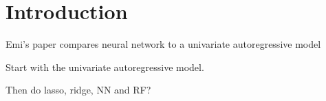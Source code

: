 \section{Introduction} \label{sec:intro}


Emi's paper compares neural network to a univariate autoregressive model

Start with the univariate autoregressive model.

Then do lasso, ridge, NN and RF?

